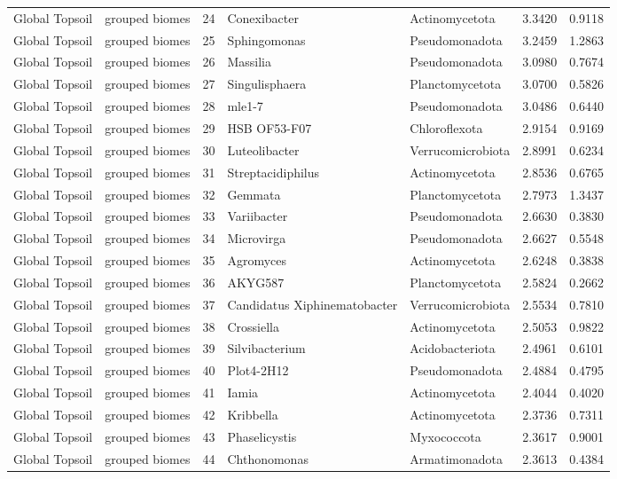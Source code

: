 \documentclass[12pt, oneside]{report}
\begin{document}
\begin{center}
\begin{longtable}{llrp{2.7cm}p{2.2cm}rr}
Global Topsoil & grouped biomes & 24 & Conexibacter & Actinomycetota & 3.3420 & 0.9118 \\
Global Topsoil & grouped biomes & 25 & Sphingomonas & Pseudomonadota & 3.2459 & 1.2863 \\
Global Topsoil & grouped biomes & 26 & Massilia & Pseudomonadota & 3.0980 & 0.7674 \\
Global Topsoil & grouped biomes & 27 & Singulisphaera & Planctomycetota & 3.0700 & 0.5826 \\
Global Topsoil & grouped biomes & 28 & mle1-7 & Pseudomonadota & 3.0486 & 0.6440 \\
Global Topsoil & grouped biomes & 29 & HSB OF53-F07 & Chloroflexota & 2.9154 & 0.9169 \\
Global Topsoil & grouped biomes & 30 & Luteolibacter & Verrucomicrobiota & 2.8991 & 0.6234 \\
Global Topsoil & grouped biomes & 31 & Streptacidiphilus & Actinomycetota & 2.8536 & 0.6765 \\
Global Topsoil & grouped biomes & 32 & Gemmata & Planctomycetota & 2.7973 & 1.3437 \\
Global Topsoil & grouped biomes & 33 & Variibacter & Pseudomonadota & 2.6630 & 0.3830 \\
Global Topsoil & grouped biomes & 34 & Microvirga & Pseudomonadota & 2.6627 & 0.5548 \\
Global Topsoil & grouped biomes & 35 & Agromyces & Actinomycetota & 2.6248 & 0.3838 \\
Global Topsoil & grouped biomes & 36 & AKYG587 & Planctomycetota & 2.5824 & 0.2662 \\
Global Topsoil & grouped biomes & 37 & Candidatus Xiphinematobacter & Verrucomicrobiota & 2.5534 & 0.7810 \\
Global Topsoil & grouped biomes & 38 & Crossiella & Actinomycetota & 2.5053 & 0.9822 \\
Global Topsoil & grouped biomes & 39 & Silvibacterium & Acidobacteriota & 2.4961 & 0.6101 \\
Global Topsoil & grouped biomes & 40 & Plot4-2H12 & Pseudomonadota & 2.4884 & 0.4795 \\
Global Topsoil & grouped biomes & 41 & Iamia & Actinomycetota & 2.4044 & 0.4020 \\
Global Topsoil & grouped biomes & 42 & Kribbella & Actinomycetota & 2.3736 & 0.7311 \\
Global Topsoil & grouped biomes & 43 & Phaselicystis & Myxococcota & 2.3617 & 0.9001 \\
Global Topsoil & grouped biomes & 44 & Chthonomonas & Armatimonadota & 2.3613 & 0.4384 \\

\end{longtable}
\end{center}
\end{document}
